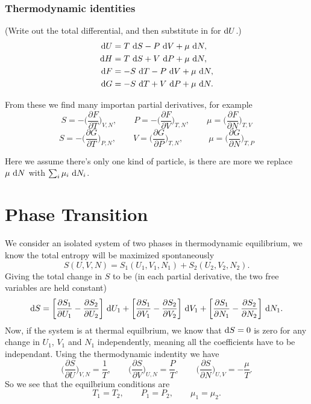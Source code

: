\documentclass[a4paper, 11pt, notitlepage, english]{article}
\renewcommand{\d}{{\rm d}}
\newcommand{\p}{\partial}
\begin{document}
\newpage

\subsubsection*{Thermodynamic identities}
(Write out the total differential, and then substitute in for $\d U$.)
\begin{align*}
\d U &= T\ \d S - P \ \d V + \mu \ \d N, \\
\d H &= T \ \d S + V\ \d P + \mu \ \d N, \\
\d F &=  - S \ \d T - P \ \d V + \mu \ \d N, \\
\d G &= -S \ \d T + V\ \d P + \mu \ \d N.
\end{align*}

From these we find many importan partial derivatives, for example
$$S = -\bigg(\frac{\p F}{\p T}\bigg)_{V, N}, \qquad P = -\bigg(\frac{\p F}{\p V}\bigg)_{T, N}, \qquad \mu = \bigg(\frac{\p F}{\p N}\bigg)_{T,V}$$
$$S = -\bigg(\frac{\p G}{\p T}\bigg)_{P, N}, \qquad V = \bigg(\frac{\p G}{\p P}\bigg)_{T, N}, \qquad\quad \mu = \bigg(\frac{\p G}{\p N}\bigg)_{T,P}$$

Here we assume there's only one kind of particle, is there are more we replace $\mu \ \d N$ with $\sum_i \mu_i \ \d N_i$.

\clearpage

\section{Phase Transition}

We consider an isolated system of two phases in thermodynamic equilibrium, we know the total entropy will be maximized spontaneously
$$S(U,V,N) = S_1(U_1,V_1,N_1) + S_2(U_2,V_2,N_2).$$
Giving the total change in $S$ to be (in each partial derivative, the two free variables are held constant)
$$\d S = \bigg[\frac{\p S_1}{\p U_1} - \frac{\p S_2}{\p U_2}\bigg]\ \d U_1 + \bigg[\frac{\p S_1}{\p V_1} - \frac{\p S_2}{\p V_2}\bigg]\ \d V_1 + \bigg[\frac{\p S_1}{\p N_1} - \frac{\p S_2}{\p N_2}\bigg]\ \d N_1.$$
Now, if the system is at thermal equilbrium, we know that $\d S = 0$ is zero for any change in $U_1$, $V_1$ and $N_1$ independently, meaning all the coefficients have to be independant. Using the thermodynamic indentity we have
$$\bigg(\frac{\p S}{\p U}\bigg)_{V, N} = \frac{1}{T}, \qquad \bigg(\frac{\p S}{\p V}\bigg)_{U, N} = \frac{P}{T}, \qquad \bigg(\frac{\p S}{\p N}\bigg)_{U, V} = -\frac{\mu}{T}.$$
So we see that the equilbrium conditions are
$$T_1 = T_2, \qquad P_1 = P_2, \qquad \mu_1 = \mu_2.$$
\end{document}
